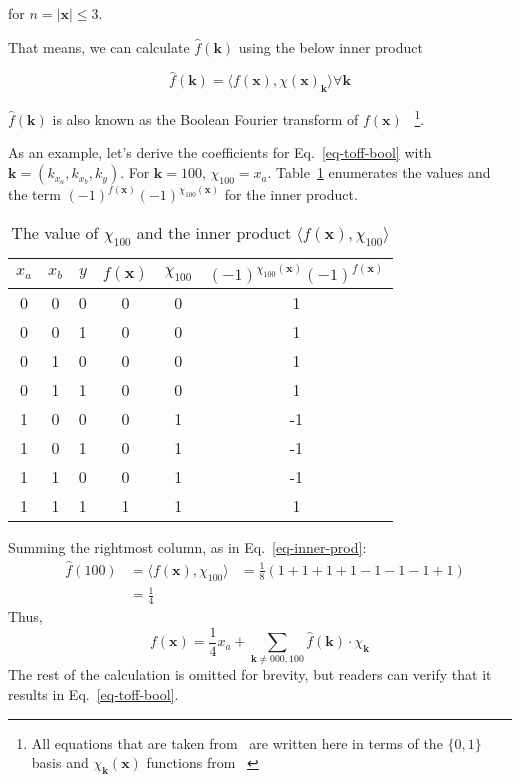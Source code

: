 for $n = |\mathbf{x}| \leq 3$.

That means, we can calculate $\hat{f}(\mathbf{k})$ using the below inner product

\begin{equation}
  \label{eq-fhat-prod}
  \hat{f}(\mathbf{k}) = \langle f(\mathbf{x}), \chi(\mathbf{x})_{\mathbf{k}} \rangle \forall \mathbf{k} 
\end{equation}

$\hat{f}(\mathbf{k})$ is also known as the Boolean Fourier transform of $f(\mathbf{x})$~\cite{bib-odonnell}
\footnote{All equations that are taken from~\cite{bib-odonnell} are written here
in terms of the $\{0,1\}$ basis and $\chi_{\mathbf{k}}(\mathbf{x})$ functions from ~\cite{bib-amy-matroid}}.

\begin{example}
As an example, let's derive the coefficients for Eq.~\ref{eq-toff-bool} with $\mathbf{k} = (k_{x_a}, k_{x_b}, k_y)$.
For $\mathbf{k} = 100$, $\chi_{100} = x_a$. Table~\ref{table-ex-100} enumerates the values and the term $(-1)^{f(\mathbf{x})} (-1)^{\chi_{100}(\mathbf{x})}$ for the inner product.
\begin{table}[h]
  \begin{center}
    \begin{tabular}{c|c|c|c|c|c}
      \hline
      $x_a$ & $x_b$ & $y$ & $f(\mathbf{x})$ & $\chi_{100}$ & $(-1)^{\chi_{100}(\mathbf{x})} (-1)^{f(\mathbf{x})}$ \\\hline
      0 & 0 & 0 & 0 & 0 & 1\\\hline
      0 & 0 & 1 & 0 & 0 & 1\\\hline
      0 & 1 & 0 & 0 & 0 & 1\\\hline
      0 & 1 & 1 & 0 & 0 & 1\\\hline
      1 & 0 & 0 & 0 & 1 & -1\\\hline
      1 & 0 & 1 & 0 & 1 & -1\\\hline
      1 & 1 & 0 & 0 & 1 & -1\\\hline      
      1 & 1 & 1 & 1 & 1 & 1\\\hline
    \end{tabular}
    \caption{The value of $\chi_{100}$ and the inner product $\langle f(\mathbf{x}), \chi_{100} \rangle$}
    \label{table-ex-100}
  \end{center}
\end{table}

Summing the rightmost column, as in Eq.~\ref{eq-inner-prod}:
\begin{align}
  &\hat{f}(100) &= \langle f(\mathbf{x}), \chi_{100} \rangle &= \frac{1}{8} ( 1 + 1 + 1 + 1 - 1 - 1 - 1 + 1 ) \\
  &&= \frac{1}{4}\nonumber
\end{align}
Thus,
\begin{equation}
  f(\mathbf{x}) = \frac{1}{4}x_a + \sum_{\mathbf{k} \neq 000,100} \hat{f}(\mathbf{k}) \cdot \chi_{\mathbf{k}}
\end{equation}
The rest of the calculation is omitted for brevity, but readers can verify that it results in Eq.~\ref{eq-toff-bool}.
\end{example}


